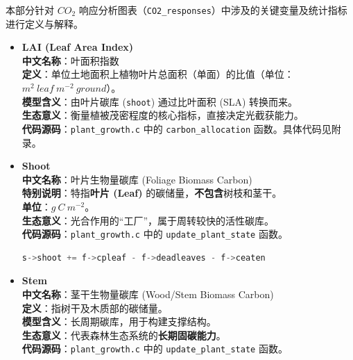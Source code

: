 \documentclass[10pt]{config}
\begin{document}
本部分针对 $CO_2$ 响应分析图表（\texttt{CO2\_responses}）中涉及的关键变量及统计指标进行定义与解释。

\begin{itemize}
    \item \textbf{LAI (Leaf Area Index)} \\
    \textbf{中文名称}：叶面积指数 \\
    \textbf{定义}：单位土地面积上植物叶片总面积（单面）的比值（单位：$m^2~leaf~m^{-2}~ground$）。 \\
    \textbf{模型含义}：由叶片碳库 (\texttt{shoot}) 通过比叶面积 (SLA) 转换而来。 \\
    \textbf{生态意义}：衡量植被茂密程度的核心指标，直接决定光截获能力。 \\
    \textbf{代码源码}：\texttt{plant\_growth.c} 中的 \texttt{carbon\_allocation} 函数。具体代码见附录。

\hspace{1em}

    \item \textbf{Shoot} \\
    \textbf{中文名称}：叶片生物量碳库 (Foliage Biomass Carbon) \\
    \textbf{特别说明}：特指\textbf{叶片 (Leaf)} 的碳储量，\textbf{不包含}树枝和茎干。 \\
    \textbf{单位}：$g~C~m^{-2}$。 \\
    \textbf{生态意义}：光合作用的“工厂”，属于周转较快的活性碳库。 \\
    \textbf{代码源码}：\texttt{plant\_growth.c} 中的 \texttt{update\_plant\_state} 函数。

\begin{lstlisting}[language=C]
    s->shoot += f->cpleaf - f->deadleaves - f->ceaten
\end{lstlisting}

\hspace{1em}

    \item \textbf{Stem} \\
    \textbf{中文名称}：茎干生物量碳库 (Wood/Stem Biomass Carbon) \\
    \textbf{定义}：指树干及木质部的碳储量。 \\
    \textbf{模型含义}：长周期碳库，用于构建支撑结构。 \\
    \textbf{生态意义}：代表森林生态系统的\textbf{长期固碳能力}。 \\
    \textbf{代码源码}：\texttt{plant\_growth.c} 中的 \texttt{update\_plant\_state} 函数。


\end{itemize}
\end{document}

